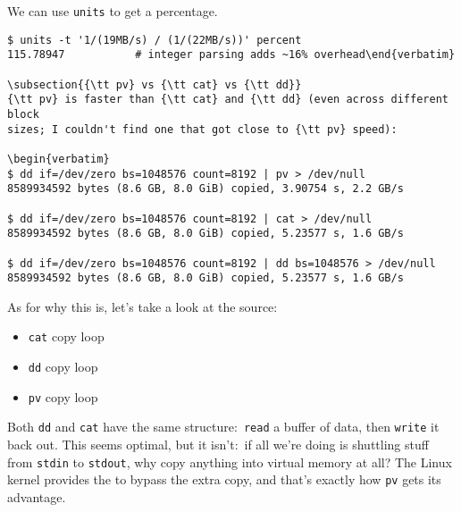 We can use {\tt units} to get a percentage.

\begin{verbatim}
$ units -t '1/(19MB/s) / (1/(22MB/s))' percent
115.78947           # integer parsing adds ~16% overhead\end{verbatim}

\subsection{{\tt pv} vs {\tt cat} vs {\tt dd}}
{\tt pv} is faster than {\tt cat} and {\tt dd} (even across different block
sizes; I couldn't find one that got close to {\tt pv} speed):

\begin{verbatim}
$ dd if=/dev/zero bs=1048576 count=8192 | pv > /dev/null
8589934592 bytes (8.6 GB, 8.0 GiB) copied, 3.90754 s, 2.2 GB/s

$ dd if=/dev/zero bs=1048576 count=8192 | cat > /dev/null
8589934592 bytes (8.6 GB, 8.0 GiB) copied, 5.23577 s, 1.6 GB/s

$ dd if=/dev/zero bs=1048576 count=8192 | dd bs=1048576 > /dev/null
8589934592 bytes (8.6 GB, 8.0 GiB) copied, 5.23577 s, 1.6 GB/s\end{verbatim}

As for why this is, let's take a look at the source:

\begin{itemize}
  \item {}
            {{\tt cat} copy loop}
  \item {}
            {{\tt dd} copy loop}
  \item {}
            {{\tt pv} copy loop}
\end{itemize}

Both {\tt dd} and {\tt cat} have the same structure:~{\tt read} a buffer of
data, then {\tt write} it back out. This seems optimal, but it isn't:~if all
we're doing is shuttling stuff from {\tt stdin} to {\tt stdout}, why copy
anything into virtual memory at all? The Linux kernel provides the
to bypass the extra copy, and that's exactly how {\tt pv} gets its advantage.

